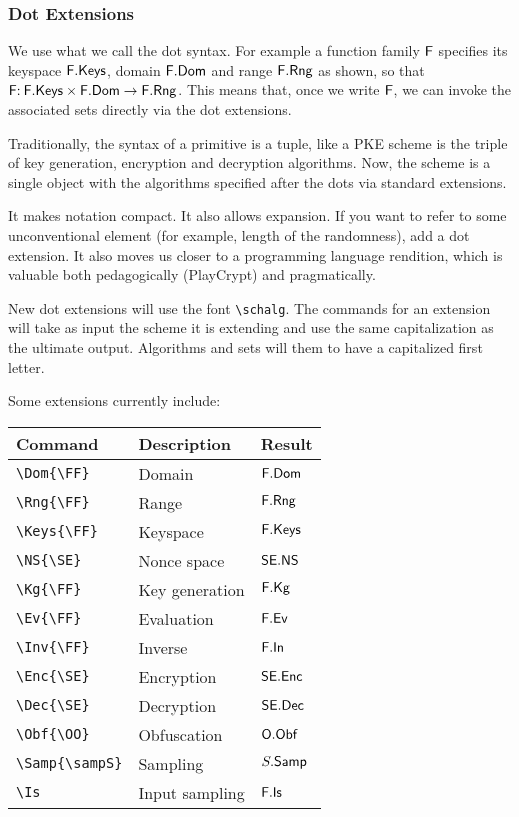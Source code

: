 \documentclass[11pt,twoside]{report}
\begin{document}
\subsubsection{Dot Extensions}
We use what we call the dot syntax. For example a function family $\mathsf{F}$ specifies its keyspace $\mathsf{F}.\mathsf{Keys}$, domain $\mathsf{F}.\mathsf{Dom}$ and range $\mathsf{F}.\mathsf{Rng}$ as shown, so that $\mathsf{F} {:\:} \mathsf{F}.\mathsf{Keys} \times \mathsf{F}.\mathsf{Dom}\to \mathsf{F}.\mathsf{Rng}$. This means that, once we write $\mathsf{F}$, we can invoke the associated sets directly via the dot extensions. 

Traditionally, the syntax of a primitive is a tuple, like a PKE scheme is the triple of key generation, encryption and decryption algorithms. Now, the scheme is a single object with the algorithms specified after the dots via standard extensions. 

It makes notation compact. It also allows expansion. If you want to refer to some unconventional element (for example, length of the randomness), add a dot extension. It also moves us closer to a programming language rendition, which is valuable both pedagogically (PlayCrypt) and pragmatically.

New dot extensions will use the font \lstinline$\schalg$.
The commands for an extension will take as input the scheme it is extending and use the same capitalization as the ultimate output. 
Algorithms and sets will them to have a capitalized first letter.

Some extensions currently include:
\begin{center}
\begin{tabular}{l l l}
	\textbf{Command} & \textbf{Description} & \textbf{Result} \\\hline
	\lstinline$\Dom{\FF}$ & Domain & $\mathsf{F}.\mathsf{Dom}$  \\
	\lstinline$\Rng{\FF}$ & Range & $\mathsf{F}.\mathsf{Rng}$  \\
	\lstinline$\Keys{\FF}$ & Keyspace & $\mathsf{F}.\mathsf{Keys}$  \\
	\lstinline$\NS{\SE}$ & Nonce space & $\mathsf{SE}.\mathsf{NS}$  \\
	\lstinline$\Kg{\FF}$ & Key generation& $\mathsf{F}.\mathsf{Kg}$  \\
	\lstinline$\Ev{\FF}$ & Evaluation & $\mathsf{F}.\mathsf{Ev}$ \\
	\lstinline$\Inv{\FF}$ & Inverse & $\mathsf{F}.\mathsf{In}$  \\
	\lstinline$\Enc{\SE}$ & Encryption & $\mathsf{SE}.\mathsf{Enc}$  \\
	\lstinline$\Dec{\SE}$ & Decryption & $\mathsf{SE}.\mathsf{Dec}$  \\
	\lstinline$\Obf{\OO}$ & Obfuscation & $\mathsf{O}.\mathsf{Obf}$ \\
	\lstinline$\Samp{\sampS}$ & Sampling & $S.\mathsf{Samp}$\\
	\lstinline$\Is$ & Input sampling & $\mathsf{F}.\mathsf{Is}$
\end{tabular}
\end{center}
\end{document}

